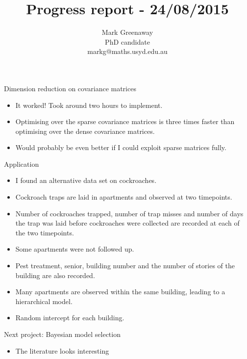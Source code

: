 \documentclass{beamer}
\title{Progress report - 24/08/2015}
\author{Mark Greenaway\\PhD candidate\\markg@maths.usyd.edu.au}
\begin{document}
\begin{frame}
\maketitle
\end{frame}

\begin{frame}{Dimension reduction on covariance matrices}
\begin{itemize}
\item It worked! Took around two hours to implement.
\item Optimising over the sparse covariance matrices is three times faster than optimising
		over the dense covariance matrices.
\item Would probably be even better if I could exploit sparse matrices fully.
\end{itemize}
\end{frame}

\begin{frame}{Application}
\begin{itemize}
\item I found an alternative data set on cockroaches.
\item Cockroach traps are laid in apartments and observed at two timepoints.
\item Number of cockroaches trapped, number of trap misses and number of days the trap was laid
	  before cockroaches were collected are recorded at each of the two timepoints.
\item Some apartments were not followed up.
\item Pest treatment, senior, building number and the number of stories of the building are also
      recorded.
\item Many apartments are observed within the same building, leading to a hierarchical model.
\item Random intercept for each building.
\end{itemize}
\end{frame}

\begin{frame}{Next project: Bayesian model selection}
\begin{itemize}
\item The literature looks interesting
\end{itemize}
\end{frame}
\end{document}
